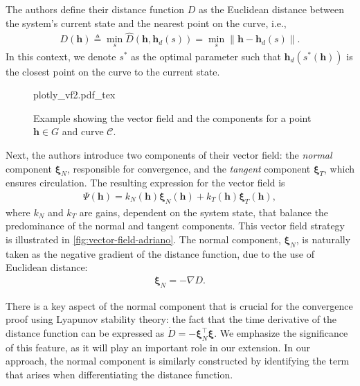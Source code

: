 The authors define their distance function $D$ as the Euclidean distance between the system's current state and the nearest point on the curve, i.e., 
\begin{align}
    D(\mathbf{h}) \triangleq \min_{s}\widehat{D}(\mathbf{h}, \mathbf{h}_d(s))=\min_{s}\|\mathbf{h}- \mathbf{h}_d(s)\|. \label{eq:adriano-EC-distance}   
\end{align}
In this context, we denote $s^*$ as the optimal parameter such that $\mathbf{h}_d(s^*(\mathbf{h}))$ is the closest point on the curve to the current state.
\begin{figure}
    \centering
    \def\svgwidth{.8\linewidth}
    {plotly_vf2.pdf_tex}
    \caption{Example showing the vector field and the components for a point $\mathbf{h}\in G$ and curve $\mathcal{C}$.}
    \label{fig:vector-field-adriano}
\end{figure}

Next, the authors introduce two components of their vector field: the \emph{normal} component $\boldsymbol{\xi}_{N}$, responsible for convergence, and the \emph{tangent} component $\boldsymbol{\xi}_{T}$, which ensures circulation. The resulting expression for the vector field is 
\begin{align}
    \Psi(\mathbf{h}) = k_N(\mathbf{h})\boldsymbol{\xi}_{N}(\mathbf{h}) + k_T(\mathbf{h})\boldsymbol{\xi}_{T}(\mathbf{h}), \label{eq:adriano-vector-field-expression}    
\end{align}
where $k_N$ and $k_T$ are gains, dependent on the system state, that balance the predominance of the normal and tangent components. This vector field strategy is illustrated in \autoref{fig:vector-field-adriano}. The normal component, $\boldsymbol{\xi}_{N}$, is naturally taken as the negative gradient of the distance function, due to the use of Euclidean distance:
\begin{align}
    \boldsymbol{\xi}_{N} = -\nabla D.
\end{align}

There is a key aspect of the normal component that is crucial for the convergence proof using Lyapunov stability theory: the fact that the time derivative of the distance function can be expressed as $\dot{D}=-\boldsymbol{\xi}_{N}^{\top}{\boldsymbol{\xi}}$. We emphasize the significance of this feature, as it will play an important role in our extension. In our approach, the normal component is similarly constructed by identifying the term that arises when differentiating the distance function.

